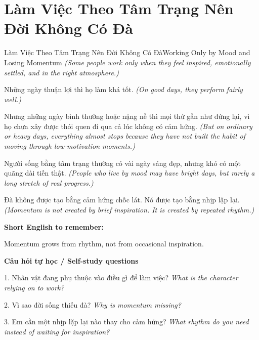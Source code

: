 \section{Làm Việc Theo Tâm Trạng Nên Đời Không Có Đà}
\begin{truyen}{Làm Việc Theo Tâm Trạng Nên Đời Không Có Đà}{Working Only by Mood and Losing Momentum}
\textit{(Some people work only when they feel inspired, emotionally settled, and in the right atmosphere.)}

Những ngày thuận lợi thì họ làm khá tốt.
\textit{(On good days, they perform fairly well.)}

Nhưng những ngày bình thường hoặc nặng nề thì mọi thứ gần như đứng lại, vì họ chưa xây được thói quen đi qua cả lúc không có cảm hứng.
\textit{(But on ordinary or heavy days, everything almost stops because they have not built the habit of moving through low-motivation moments.)}

Người sống bằng tâm trạng thường có vài ngày sáng đẹp, nhưng khó có một quãng dài tiến thật.
\textit{(People who live by mood may have bright days, but rarely a long stretch of real progress.)}

\end{truyen}

\begin{baihoc}
Đà không được tạo bằng cảm hứng chốc lát. Nó được tạo bằng nhịp lặp lại.
\textit{(Momentum is not created by brief inspiration. It is created by repeated rhythm.)}
\end{baihoc}

\begin{ghinhoanh}
\textbf{Short English to remember:}

Momentum grows from rhythm, not from occasional inspiration.

\end{ghinhoanh}

\begin{tuhocnhanh}
\textbf{Câu hỏi tự học / Self-study questions}

1. Nhân vật đang phụ thuộc vào điều gì để làm việc? \textit{What is the character relying on to work?}

2. Vì sao đời sống thiếu đà? \textit{Why is momentum missing?}

3. Em cần một nhịp lặp lại nào thay cho cảm hứng? \textit{What rhythm do you need instead of waiting for inspiration?}
\end{tuhocnhanh}
